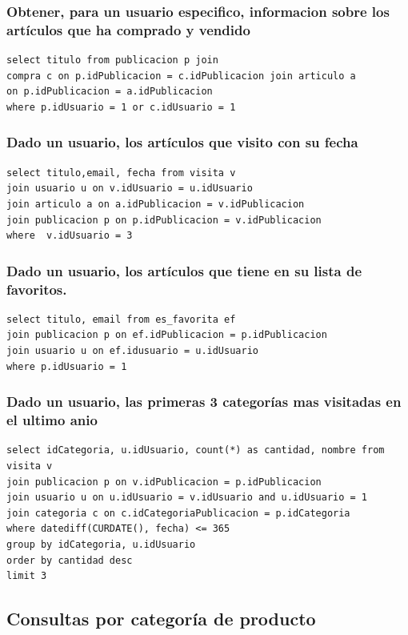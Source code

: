 \documentclass[a4paper, 10pt, twoside]{article}
\begin{document}
\subsubsection{Obtener, para un usuario especifico, informacion sobre los art\'iculos que ha comprado y vendido}
\begin{verbatim}
select titulo from publicacion p join 
compra c on p.idPublicacion = c.idPublicacion join articulo a 
on p.idPublicacion = a.idPublicacion 
where p.idUsuario = 1 or c.idUsuario = 1 
\end{verbatim}


\subsubsection{Dado un usuario, los art\'iculos que visito con su fecha}
\begin{verbatim}
select titulo,email, fecha from visita v 
join usuario u on v.idUsuario = u.idUsuario 
join articulo a on a.idPublicacion = v.idPublicacion 
join publicacion p on p.idPublicacion = v.idPublicacion 
where  v.idUsuario = 3
\end{verbatim}

\subsubsection{Dado un usuario, los art\'iculos que tiene en su lista de favoritos.}
\begin{verbatim}
select titulo, email from es_favorita ef 
join publicacion p on ef.idPublicacion = p.idPublicacion 
join usuario u on ef.idusuario = u.idUsuario  
where p.idUsuario = 1
\end{verbatim}

\subsubsection{Dado un usuario, las primeras 3 categor\'ias mas visitadas en el ultimo anio}
\begin{verbatim}
select idCategoria, u.idUsuario, count(*) as cantidad, nombre from visita v 
join publicacion p on v.idPublicacion = p.idPublicacion 
join usuario u on u.idUsuario = v.idUsuario and u.idUsuario = 1
join categoria c on c.idCategoriaPublicacion = p.idCategoria
where datediff(CURDATE(), fecha) <= 365 
group by idCategoria, u.idUsuario
order by cantidad desc
limit 3
\end{verbatim}
\newpage
\subsection{Consultas por categor\'ia de producto}
\end{document}
